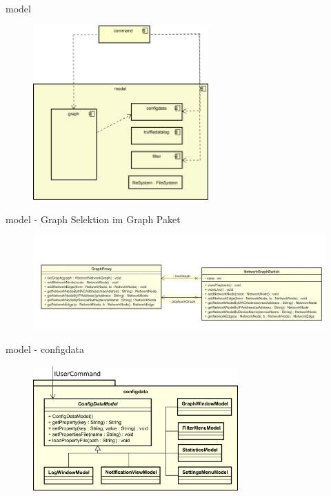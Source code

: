 \begin{frame}{model}
  \begin{figure}
    \centering
    \includegraphics[width=0.6\textwidth]{./images/model.png}
  \end{figure}
\end{frame}

\begin{frame}{model - Graph Selektion im Graph Paket}
  \begin{figure}
    \centering
    \includegraphics[width=\textwidth]{./images/graph-proxy.png}
  \end{figure}
\end{frame}

\begin{frame}{model - configdata}
  \begin{figure}
    \centering
    \includegraphics[width=0.7\textwidth]{./images/configdata.png}
  \end{figure}
\end{frame}
